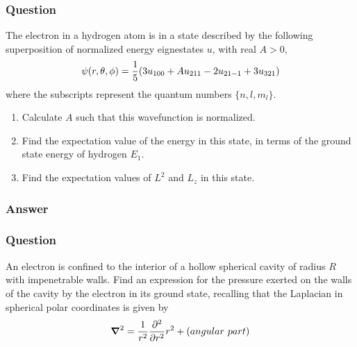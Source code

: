\subsubsection{Question}
The electron in a hydrogen atom is in a state described by the following superposition of normalized energy eignestates $u$, with real $A > 0$,
\begin{equation*}
	\psi(r,\theta,\phi) = \frac{1}{5}\qty(3u_{100} + Au_{211} - 2u_{21-1}+3u_{321})
\end{equation*}
where the subscripts represent the quantum numbers $\{n, l, m_l \}$.
\begin{enumerate}
	\item Calculate $A$ such that this wavefunction is normalized.
	\item Find the expectation value of the energy in this state, in terms of the ground state energy of hydrogen $E_1$.
	\item Find the expectation values of $L^2$ and $L_z$ in this state. 
\end{enumerate}
\subsubsection{Answer}


\subsubsection{Question}
An electron is confined to the interior of a hollow spherical cavity of radius $R$ with impenetrable walls. Find an expression for the pressure exerted on the walls of the cavity by the electron in its ground state, recalling that the Laplacian in spherical polar coordinates is given by
\begin{equation*}
 	\grad^2 = \frac{1}{r^2}\pdv[2]{r}r^2 + (angular\ part)
\end{equation*}
